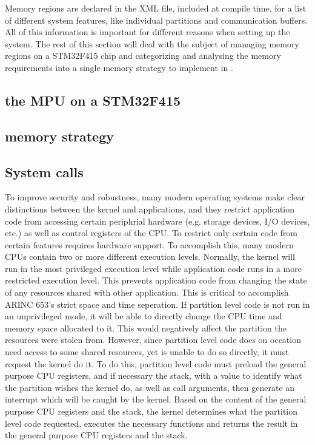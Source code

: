 Memory regions are declared in the XML file, included at compile time, for a list
of different system features, like individual partitions and communication buffers.
All of this information is important for different reasons when setting up the system.
The rest of this section will deal with the subject of managing memory regions on a STM32F415 chip
and categorizing and analysing the memory requirements into a single memory strategy to implement in
.

\subsection{the MPU on a STM32F415}

\subsection{memory strategy}

\subsection{System calls}
To improve security and robustness, many modern operating systems make clear 
distinctions between the kernel and applications, and they restrict application
code from accessing certain periphrial hardware (e.g. storage devices, I/O
devices, etc.) as well as control registers of the CPU. 
To restrict only certain code from certain features requires hardware support.
To accomplish this, many modern CPUs contain two or more different execution
levels. Normally, the kernel will run in the most privileged execution level
while application code runs in a more restricted execution level. This prevents
application code from changing the state of any resources shared with other
application. This is critical to accomplish ARINC 653's strict space and time 
seperation. If partition level code is not run in an unprivileged mode, it will
be able to directly change the CPU time and memory space allocated to it. This
would negatively affect the partition the resources were stolen from. However,
since partition level code does on occation need access to some shared resources,
yet is unable to do so directly, it must request the kernel do it. To do this,
partition level code must preload the general purpose CPU registers, and if
necessary the stack, with a value to identify what the partition wishes the
kernel do, as well as call arguments, then generate an interrupt which will be
caught by the kernel. Based on the content of the general purpose CPU registers
and the stack, the kernel determines what the partition level code requested,
executes the necessary functions and returns the result in the general purpose 
CPU registers and the stack.


